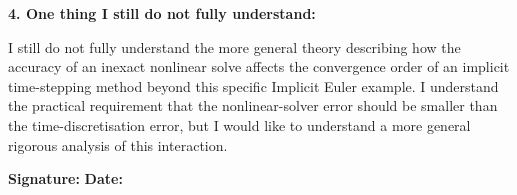 \begin{formbox}
\vspace{0.2em}
\textbf{4. One thing I still do not fully understand:}

I still do not fully understand the more general theory describing how the
accuracy of an inexact nonlinear solve affects the convergence order of an
implicit time-stepping method beyond this specific Implicit Euler example. I
understand the practical requirement that the nonlinear-solver error should be
smaller than the time-discretisation error, but I would like to understand a
more general rigorous analysis of this interaction.

\vspace{0.3em}
\textbf{Signature:} \underline{\hspace{4.5cm}}
\qquad
\textbf{Date:} \underline{\hspace{2.5cm}}

\par\endgroup
\end{formbox}
\clearpage
